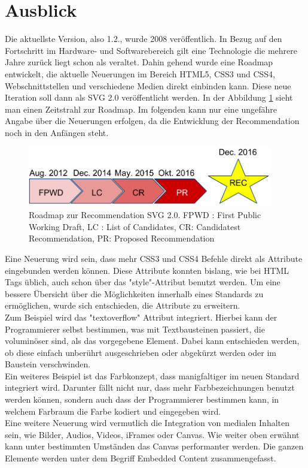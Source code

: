\section{Ausblick}
Die aktuellste Version, also 1.2., wurde 2008 veröffentlich. In Bezug auf den Fortschritt im Hardware- und Softwarebereich gilt eine Technologie die mehrere Jahre zurück liegt schon als veraltet. Dahin gehend wurde eine Roadmap entwickelt, die aktuelle Neuerungen im Bereich HTML5, CSS3 und CSS4, Webschnittstellen und verschiedene Medien direkt einbinden kann. Diese neue Iteration soll dann als SVG 2.0 veröffentlicht werden. In der Abbildung \ref{roadmap} sieht man einen Zeitstrahl zur Roadmap. Im folgenden kann nur eine ungefähre Angabe über die Neuerungen erfolgen, da die Entwicklung der Recommendation noch in den Anfängen steht.\\

\begin{figure}[!ht]
  \centering
  \includegraphics[width=0.95\textwidth]{pictures/roadmap.jpg}
  \caption{Roadmap zur Recommendation SVG 2.0. FPWD : First Public Working Draft,
    LC : List of Candidates,
    CR: Candidatest Recommendation,
  PR: Proposed Recommendation}
  \label{roadmap}
\end{figure}
Eine Neuerung wird sein, dass mehr CSS3 und CSS4 Befehle direkt als Attribute eingebunden werden können. Diese Attribute konnten bislang, wie bei HTML Tags üblich, auch schon über das "style"-Attribut benutzt werden. Um eine bessere Übersicht über die Möglichkeiten innerhalb eines Standards zu ermöglichen, wurde sich entschieden, die Attribute zu erweitern.\\
Zum Beispiel wird das "textoverflow" Attribut integriert. Hierbei kann der Programmierer selbst bestimmen, was mit Textbausteinen passiert, die voluminöser sind, als das vorgegebene Element. Dabei kann entschieden werden, ob diese einfach unberührt ausgeschrieben oder abgekürzt werden oder im Baustein verschwinden. \\
Ein weiteres Beispiel ist das Farbkonzept, dass manigfaltiger im neuen Standard integriert wird. Darunter fällt nicht nur, dass mehr Farbbezeichnungen benutzt werden können, sondern auch dass der Programmierer bestimmen kann, in welchem Farbraum die Farbe kodiert und eingegeben wird.\\

Eine weitere Neuerung wird vermutlich die Integration von medialen Inhalten sein, wie Bilder, Audios, Videos, iFrames oder Canvas. Wie weiter oben erwähnt kann unter bestimmten Umständen das Canvas performanter werden. Die ganzen Elemente werden unter dem Begriff Embedded Content zusammengefasst.\\

\newpage

